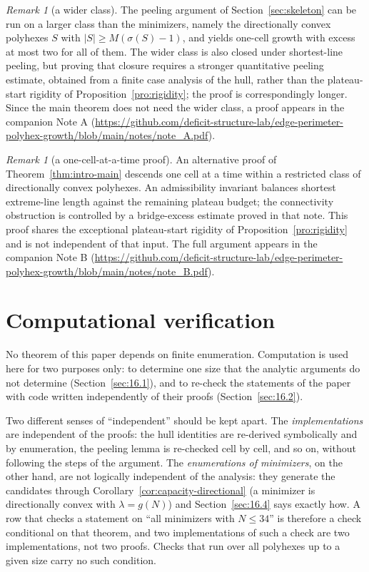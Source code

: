 \documentclass[11pt]{article}
\theoremstyle{plain}
\theoremstyle{definition}
\theoremstyle{remark}
\newtheorem{remark}[theorem]{Remark}
\begin{document}
\begin{remark}[a wider class]\label{rem:nearext}
The peeling argument of Section~\ref{sec:skeleton} can be run on a larger class than the
minimizers, namely the directionally convex polyhexes \(S\) with \(|S|\ge M(\sigma(S)-1)\),
and yields one-cell growth with excess at most two for all of them. The wider class is also
closed under shortest-line peeling, but proving that closure requires a stronger
quantitative peeling estimate, obtained from a finite case analysis of the hull, rather
than the plateau-start rigidity of Proposition~\ref{pro:rigidity}; the proof is
correspondingly longer. Since the
main theorem does not need the wider class, a proof appears in the companion Note A (\url{https://github.com/deficit-structure-lab/edge-perimeter-polyhex-growth/blob/main/notes/note_A.pdf}).
\end{remark}

\begin{remark}[a one-cell-at-a-time proof]\label{rem:onecell}
An alternative proof of Theorem~\ref{thm:intro-main} descends one cell
at a time within a restricted class of directionally convex polyhexes.
An admissibility invariant balances shortest extreme-line length against
the remaining plateau budget; the connectivity obstruction is controlled
by a bridge-excess estimate proved in that note. This proof shares the exceptional
plateau-start rigidity of Proposition~\ref{pro:rigidity} and is not
independent of that input. The full argument appears in the companion Note B (\url{https://github.com/deficit-structure-lab/edge-perimeter-polyhex-growth/blob/main/notes/note_B.pdf}).
\end{remark}



\section{Computational verification}\label{sec:computation}

No theorem of this paper depends on finite enumeration. Computation is used here for two
purposes only: to determine one size that the analytic arguments do not determine
(Section~\ref{sec:16.1}), and to re-check the statements of the paper with code written
independently of their proofs (Section~\ref{sec:16.2}).

Two different senses of ``independent'' should be kept apart. The \emph{implementations}
are independent of the proofs: the hull identities are re-derived symbolically and by
enumeration, the peeling lemma is re-checked cell by cell, and so on, without following
the steps of the argument. The \emph{enumerations of minimizers}, on the other hand, are
not logically independent of the analysis: they generate the candidates through
Corollary~\ref{cor:capacity-directional} (a minimizer is directionally convex with
\(\lambda=g(N)\)) and Section~\ref{sec:16.4} says exactly how. A row that checks a
statement on ``all minimizers with \(N\le34\)'' is therefore a check conditional on that
theorem, and two implementations of such a check are two implementations, not two
proofs. Checks that run over all polyhexes up to a given size carry no such condition.
\end{document}
